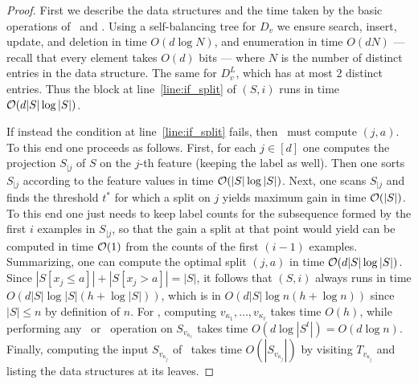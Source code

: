 \begin{proof}%

First we describe the data structures and the time taken by the basic operations of \AlgoBuild\ and \AlgoUpdate. Using a self-balancing tree for $D_v$ we ensure search, insert, update, and deletion in time $O(d \log N)$, and enumeration in time $O(d N)$ --- recall that every element takes $O(d)$ bits --- where $N$ is the number of distinct entries in the data structure. The same for $D_v^L$, which has at most $2$ distinct entries. Thus the block at line~\ref{line:if_split} of \AlgoBuild$(S,i)$ runs in time $\mathcal{O}(d|S| \log |S|)$.

If instead the condition at line~\ref{line:if_split} fails, then \AlgoBuild\ must compute $(j,a)$. To this end one proceeds as follows. First, for each $j \in [d]$ one computes the projection $S_{|j}$ of $S$ on the $j$-th feature (keeping the label as well). Then one sorts $S_{|j}$ according to the feature values in time $\mathcal{O}(|S| \log |S|)$. Next, one scans $S_{|j}$ and finds the threshold $t^*$ for which a split on $j$ yields maximum gain in time $\mathcal{O}(|S|)$. To this end one just needs to keep label counts for the subsequence formed by the first $i$ examples in $S_{|j}$, so that the gain a split at that point would yield can be computed in time $\mathcal{O}(1)$ from the counts of the first $(i-1)$ examples. 
Summarizing, one can compute the optimal split $(j,a)$ in time $\mathcal{O}(d |S| \log |S|)$. Since $|S[x_j \le a]|+|S[x_j > a]|=|S|$, it follows that \AlgoBuild$(S,i)$ always runs in time $O(d |S| \log |S| (h + \log |S|))$, which is in $O(d |S| \log n (h + \log n))$ since $|S| \le n$ by definition of $n$. For \AlgoUpdate, computing $ v_{\kappa_1},\dots, v_{\kappa_\ell} $ takes time $O(h)$, while performing any \ins\ or \del\ operation on $S_{v_{\kappa_\ell}}$ takes time $O(d \log |S^t|) = O(d \log n)$. Finally, computing the input $S_{v_{\kappa_j}}$ of \AlgoBuild\ takes time $O(|S_{v_{\kappa_j}}|)$ by visiting $T_{v_{\kappa_j}}$ and listing the data structures at its leaves.


\end{proof}
